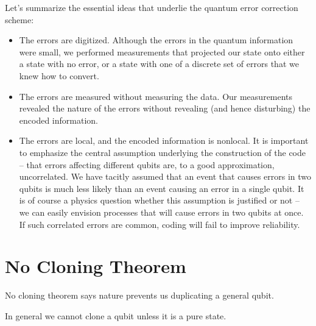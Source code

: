 Let’s summarize the essential ideas that underlie the quantum error correction scheme:
\begin{itemize}
    \item The errors are digitized. Although the errors in the quantum information
were small, we performed measurements that projected our state onto either a state with no error, or a state with one of a discrete set of errors that we knew how to convert.

\item The errors are measured without measuring the data. Our measurements revealed the nature of the errors without revealing (and hence disturbing) the encoded information.

\item The errors are local, and the encoded information is nonlocal. It is important to emphasize the central assumption underlying the construction of the code – that errors affecting different qubits are, to a good approximation, uncorrelated. We have tacitly assumed that an event that causes errors in two qubits is much less likely than an event causing an error in a single qubit. It is of course a physics question whether this assumption is justified or not – we can easily envision processes that will cause errors in two qubits at once. If such correlated errors are common, coding will fail to improve reliability.
\end{itemize}

\section{No Cloning Theorem}
No cloning theorem says nature prevents us duplicating a general qubit.  
\begin{theorem}
In general we cannot clone a qubit unless it is a pure state.    
\end{theorem}

